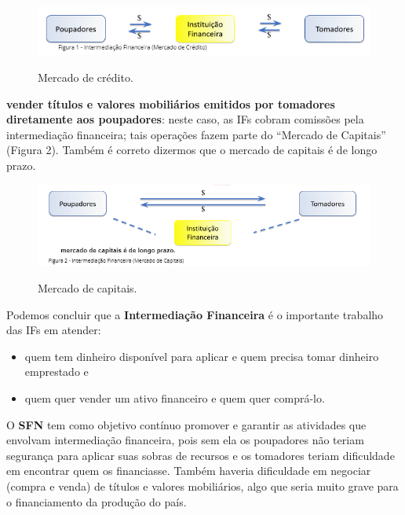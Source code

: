 \documentclass{article}\usepackage[]{graphicx}\usepackage[]{xcolor}
\begin{document}
\begin{figure}[H]
\includegraphics[width=12cm]{mercado-de-credito}
\centering
\label{mercado-de-credito}
\caption{Mercado de crédito.}
\end{figure}
  
\textbf{vender títulos e valores mobiliários emitidos por tomadores diretamente aos poupadores}: neste caso, 
as IFs cobram comissões pela intermediação financeira;  tais operações fazem parte do \enquote{Mercado de Capitais} 
(Figura 2). Também é correto dizermos que o mercado de capitais é de longo prazo.

\begin{figure}[H]
\includegraphics[width=12cm]{mercado-de-capitais}
\centering
\label{mercado-de-capitais}
\caption{Mercado de capitais.}
\end{figure}

Podemos concluir que a \textbf{Intermediação Financeira} é o importante trabalho das IFs em atender:

\begin{itemize}

  \item quem tem dinheiro disponível para aplicar e quem precisa tomar dinheiro emprestado  e

  \item quem quer vender um ativo financeiro e quem quer comprá-lo.

\end{itemize}

O \textbf{SFN} tem como objetivo contínuo promover e garantir as atividades que envolvam intermediação financeira,
pois sem ela os poupadores não teriam segurança para aplicar suas sobras de recursos e os tomadores teriam
dificuldade em encontrar quem os financiasse. Também haveria dificuldade em negociar (compra e venda) de
títulos e valores mobiliários, algo que seria muito grave para o financiamento da produção do país.\par
\end{document}
